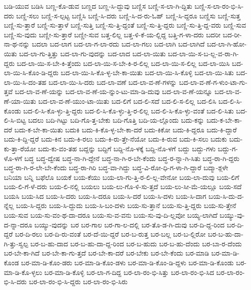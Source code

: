 {ಬಡಿ-ಯುವ
ಬಡಿಸಿ
ಬಣ್ಣ-ಕೊ-ಡುವ
ಬಣ್ಣದ
ಬಣ್ಣ-ಸಿ-ದ್ದುವು
ಬಣ್ಣಿಸ
ಬಣ್ಣಿ-ಸ-ಲಾ-ಗಿ-ದ್ದಿತು
ಬಣ್ಣಿ-ಸ-ಲಾ-ರಂ-ಭಿ-ಸಿ-ದರು
ಬಣ್ಣಿ-ಸಲು
ಬಣ್ಣಿ-ಸ-ಲ್ಪಟ್ಟ
ಬಣ್ಣಿಸಿ
ಬಣ್ಣಿ-ಸಿ-ದರು
ಬಣ್ಣಿ-ಸಿ-ದ-ರು-ಓಹ್
ಬಣ್ಣಿ-ಸಿ-ದ್ದರೂ
ಬಣ್ಣಿಸು
ಬಣ್ಣಿ-ಸುತ್ತ
ಬಣ್ಣಿ-ಸು-ತ್ತಾರೆ
ಬಣ್ಣಿ-ಸು-ತ್ತಾಳೆ
ಬಣ್ಣಿ-ಸುತ್ತಿ
ಬಣ್ಣಿ-ಸು-ತ್ತಿ-ದ್ದಂತೆ
ಬಣ್ಣಿ-ಸು-ತ್ತಿ-ದ್ದರು
ಬಣ್ಣಿ-ಸು-ತ್ತಿ-ದ್ದ-ವರು
ಬಣ್ಣಿ-ಸುವ
ಬಣ್ಣಿ-ಸು-ವುದು
ಬಣ್ಣೀ-ಸು-ತ್ತಾರೆ
ಬಣ್ಣೀ-ಸುವ
ಬತ್ತ-ಲಿಲ್ಲ
ಬತ್ತ-ಳಿ-ಕೆ-ಯ-ಲ್ಲಿದ್ದ
ಬತ್ತಿ-ಗ-ಳಾ-ದರು
ಬದರೀ
ಬದ-ರೀ-ನಾ-ಥ-ನನ್ನು
ಬದಲಾ
ಬದ-ಲಾಗ
ಬದ-ಲಾ-ಗ-ಲಾ-ರದು
ಬದ-ಲಾ-ಗಲು
ಬದ-ಲಾಗಿ
ಬದ-ಲಾಗಿದೆ
ಬದ-ಲಾ-ಗಿ-ಹೋ-ಯಿತು
ಬದ-ಲಾ-ಗು-ತ್ತಿತ್ತು
ಬದ-ಲಾ-ಗು-ವುದನ್ನು
ಬದ-ಲಾದ
ಬದ-ಲಾ-ಯಿತು
ಬದ-ಲಾ-ಯಿ-ಸ-ಬ-ಲ್ಲ-ವ-ರಾ-ಗಿ-ದ್ದರು
ಬದ-ಲಾ-ಯಿ-ಸ-ಬೇ-ಕಿ-ತ್ತೆಂದು
ಬದ-ಲಾ-ಯಿ-ಸ-ಬೇ-ಕಿ-ರ-ಲಿಲ್ಲ
ಬದ-ಲಾ-ಯಿ-ಸ-ಲಿಲ್ಲ
ಬದ-ಲಾ-ಯಿಸಿ
ಬದ-ಲಾ-ಯಿ-ಸಿ-ಕೊಂ-ಡಿ-ದ್ದರು
ಬದ-ಲಾ-ಯಿ-ಸಿ-ಕೊ-ಳ್ಳ-ಬೇ-ಕಾ-ಯಿತು
ಬದ-ಲಾ-ಯಿ-ಸಿ-ಕೊಳ್ಳಿ
ಬದ-ಲಾ-ಯಿ-ಸಿತು
ಬದ-ಲಾ-ಯಿ-ಸಿ-ದಂ-ತಹ
ಬದ-ಲಾ-ಯಿ-ಸಿ-ದರು
ಬದ-ಲಾ-ವಣೆ
ಬದ-ಲಾ-ವ-ಣೆ-ಗಳನ್ನು
ಬದ-ಲಾ-ವ-ಣೆ-ಗ-ಳುಂ-ಟಾ-ಗು-ತ್ತವೆ
ಬದ-ಲಾ-ವ-ಣೆ-ಯನ್ನು
ಬದ-ಲಾ-ವ-ಣೆ-ಯ-ನ್ನುಂ-ಟು-ಮಾ-ಡಿ-ದುವು
ಬದ-ಲಾ-ವ-ಣೆ-ಯನ್ನೂ
ಬದ-ಲಾ-ವ-ಣೆ-ಯಾ-ಯಿತು
ಬದ-ಲಾ-ವ-ಣೆ-ಯುಂ-ಟಾ-ಯಿತು
ಬದ-ಲಿಗೆ
ಬದ-ಲಿ-ಸದೆ
ಬದ-ಲಿ-ಸ-ಲಿಲ್ಲ
ಬದ-ಲಿಸಿ
ಬದ-ಲಿ-ಸಿ-ಕೊಂಡು
ಬದ-ಲಿ-ಸಿ-ಕೊ-ಳ್ಳು-ತ್ತಿ-ದ್ದರು
ಬದ-ಲಿ-ಸಿ-ಕೊ-ಳ್ಳು-ತ್ತಿ-ರ-ಲಿಲ್ಲ
ಬದ-ಲಿ-ಸಿ-ಕೊ-ಳ್ಳು-ವಂತೆ
ಬದ-ಲಿ-ಸಿತು
ಬದ-ಲಿ-ಸಿ-ಬಿಟ್ಟ
ಬದಲು
ಬದಿ-ಗಿಟ್ಟು
ಬದಿ-ಗೊ-ತ್ತ-ಬೇಕು
ಬದಿ-ಗೊತ್ತಿ
ಬದಿ-ಯ-ಲ್ಲೊಂದು
ಬದು-ಕನ್ನು
ಬದು-ಕ-ಬೇ-ಕಾ-ದರೆ
ಬದು-ಕ-ಬೇ-ಕಾ-ಯಿತು
ಬದುಕಿ
ಬದು-ಕಿ-ಕೊ-ಳ್ಳ-ಬೇ-ಕಾ-ದರೆ
ಬದು-ಕಿಕೋ
ಬದು-ಕಿ-ದ್ದರೂ
ಬದು-ಕಿ-ದ್ದಾರೆ
ಬದು-ಕಿ-ದ್ದಿ-ದ್ದರೆ
ಬದು-ಕಿನ
ಬದು-ಕಿ-ರಲು
ಬದು-ಕಿ-ರು-ತ್ತೇ-ನೆಯೋ
ಬದು-ಕಿ-ರುವ
ಬದು-ಕಿ-ಸಲು
ಬದುಕು
ಬದು-ಕು-ತ್ತಾ-ರೆಯೋ
ಬದು-ಕು-ವಂ-ತಹ
ಬದ್ದನ್ನು
ಬದ್ದಿಗೆ
ಬದ್ದಿ-ನೊ-ಳಕ್ಕೆ
ಬದ್ದಿ-ನೊ-ಳಗೆ
ಬದ್ದು
ಬದ್ದು-ಗಳು
ಬದ್ದು-ಗ-ಳೊ-ಳಗೆ
ಬದ್ಧ
ಬದ್ಧ-ದ್ವೇಷ
ಬದ್ಧ-ನಾ-ಗಿ-ದ್ದೇನೆ
ಬದ್ಧ-ನಾ-ಗಿ-ರ-ಬೇ-ಕೆಂದು
ಬದ್ಧ-ರ-ನ್ನಾ-ಗಿ-ಸಿತು
ಬದ್ಧ-ರಾ-ಗಿ-ದ್ದರು
ಬದ್ಧ-ರಾ-ಗಿ-ರ-ಲೇ-ಬೇ-ಕೆಂದು
ಬದ್ಧ-ರಾ-ಗಿರಿ
ಬದ್ಧ-ವಾ-ಗಿದ್ದು
ಬದ್ಧ-ವಿ-ರೋ-ಧಿ-ಗ-ಳಾ-ಗಿ-ದ್ದಾರೆ
ಬದ್ಮಾ-ಶ್ಗಳೇ
ಬನಿಯಾ
ಬನ್ನಿ
ಬಫೆಲೊ
ಬಯಕೆ
ಬಯ-ಕೆಯು
ಬಯ-ಲಾ-ಗು-ತ್ತಿ-ರ-ಲಿ-ಲ್ಲ-ವೇನೋ
ಬಯ-ಲಾ-ದುವು
ಬಯ-ಲಿಗೆ
ಬಯ-ಲಿ-ಗೆ-ಳೆ-ದರು
ಬಯ-ಲಿ-ನಲ್ಲಿ
ಬಯಲು
ಬಯ-ಲು-ಗೊ-ಳಿ-ಸು-ತ್ತದೆ
ಬಯ-ಲು-ಸೀ-ಮೆ-ಯಲ್ಲೂ
ಬಯ-ಸದೆ
ಬಯಸಿ
ಬಯ-ಸಿದ
ಬಯ-ಸಿ-ದರು
ಬಯ-ಸಿ-ದರೂ
ಬಯ-ಸಿ-ದರೆ
ಬಯ-ಸಿ-ದಳು
ಬಯ-ಸಿ-ದಾಗ
ಬಯ-ಸಿ-ದು-ದ-ನ್ನೆಲ್ಲ
ಬಯ-ಸಿ-ದ್ದರು
ಬಯ-ಸಿ-ದ್ದುದು
ಬಯ-ಸಿ-ಬಂ-ದಳು
ಬಯ-ಸು-ತ್ತಾನೆ
ಬಯ-ಸು-ತ್ತಿ-ದ್ದರು
ಬಯ-ಸು-ತ್ತೇನೆ
ಬಯ-ಸುವ
ಬಯ-ಸು-ವಂ-ಥ-ದಾ-ದರೂ
ಬಯ-ಸು-ವ-ವನು
ಬಯ-ಸು-ವು-ದಿ-ಲ್ಲವೋ
ಬಯ್ಯ-ಲಾಗಿದೆ
ಬಯ್ಯು-ವು-ದ-ನ್ನಾ-ದರೂ
ಬಯ್ಯು-ವುದನ್ನು
ಬರ
ಬರ-ಗಾಲ
ಬರ-ಗಾ-ಲ-ದಲ್ಲಿ
ಬರ-ತೊ-ಡ-ಗಿ-ದುವು
ಬರ-ದಿ-ದ್ದ-ರಿಂದ
ಬರ-ದಿ-ದ್ದರೆ
ಬರ-ದಿ-ರಲು
ಬರ-ದಿ-ರು-ವಂತೆ
ಬರ-ದೆ-ಯಿ-ದ್ದರೆ
ಬರ-ಬ-ರುತ್ತ
ಬರ-ಬಲ್ಲ
ಬರ-ಬ-ಲ್ಲಿರೋ
ಬರ-ಬ-ಹು-ದಾ-ಗಿ-ತ್ತು-ಸ್ವಲ್ಪ
ಬರ-ಬ-ಹು-ದಾದ
ಬರ-ಬ-ಹು-ದಾ-ದ್ದ-ರಿಂದ
ಬರ-ಬ-ಹುದು
ಬರ-ಬ-ಹು-ದೆಂದು
ಬರ-ಬಾ-ರ-ದೆಂದು
ಬರ-ಬೇ-ಕಾ-ಗಿದೆ
ಬರ-ಬೇ-ಕಾ-ಗು-ತ್ತದೆ
ಬರ-ಬೇ-ಕಾ-ದರೆ
ಬರ-ಬೇಕು
ಬರ-ಬೇ-ಕೆಂದು
ಬರ-ಮಾಡಿ
ಬರ-ಮಾ-ಡಿ-ಕೊಂಡ
ಬರ-ಮಾ-ಡಿ-ಕೊಂ-ಡರು
ಬರ-ಮಾ-ಡಿ-ಕೊಂ-ಡಳು
ಬರ-ಮಾ-ಡಿ-ಕೊಂ-ಡಿ-ದ್ದಳು
ಬರ-ಮಾ-ಡಿ-ಕೊಂಡು
ಬರ-ಮಾ-ಡಿ-ಕೊ-ಳ್ಳಲು
ಬರ-ಮಾ-ಡಿ-ಕೊಳ್ಳಿ
ಬರ-ಲಾ-ಗ-ದಿದ್ದ
ಬರ-ಲಾ-ರಂ-ಭಿ-ಸಿತ್ತು
ಬರ-ಲಾ-ರಂ-ಭಿ-ಸಿದ
ಬರ-ಲಾ-ರಂ-ಭಿ-ಸಿ-ದರು
ಬರ-ಲಾ-ರಂ-ಭಿ-ಸಿ-ದ್ದರು
ಬರ-ಲಾ-ರಂ-ಭಿ-ಸಿರು
}
